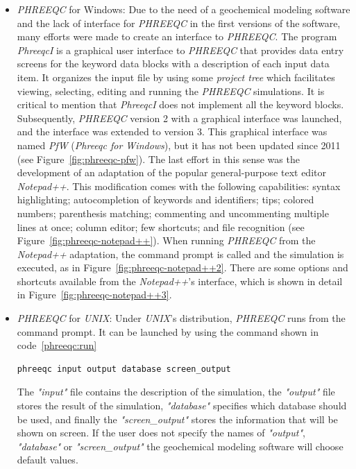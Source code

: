 \begin{itemize}
\item \emph{PHREEQC} for Windows: Due to the need of a geochemical modeling software and the lack of interface for \emph{PHREEQC} in the first versions of the software, many efforts were made to create an interface to \emph{PHREEQC}. The program \emph{PhreeqcI} is a graphical user interface to \emph{PHREEQC} that provides data entry screens for the keyword data blocks with a description of each input data item. It organizes the input file by using some \emph{project tree} which facilitates viewing, selecting, editing and running the \emph{PHREEQC} simulations. It is critical to mention that \emph{PhreeqcI} does not implement all the keyword blocks. Subsequently, \emph{PHREEQC} version 2 with a graphical interface was launched, and the interface was extended to version 3. This graphical interface was named \emph{PfW} (\emph{Phreeqc for Windows}), but it has not been updated since 2011 (see Figure~\ref{fig:phreeqc-pfw}). The last effort in this sense was the development of an adaptation of the popular general-purpose text editor \emph{Notepad++}. This modification comes with the following capabilities: syntax highlighting; autocompletion of keywords and identifiers; tips; colored numbers; parenthesis matching; commenting and uncommenting multiple lines at once; column editor; few shortcuts; and file recognition (see Figure~\ref{fig:phreeqc-notepad++}). When running \emph{PHREEQC} from the \emph{Notepad++} adaptation, the command prompt is called and the simulation is executed, as in Figure~\ref{fig:phreeqc-notepad++2}. There are some options and shortcuts available from the \emph{Notepad++}'s interface, which is shown in detail in Figure~\ref{fig:phreeqc-notepad++3}.
\item \emph{PHREEQC} for \emph{UNIX}: Under \emph{UNIX}'s distribution, \emph{PHREEQC} runs from the command prompt. It can be launched by using the command shown in code~\ref{phreeqc:run}
\begin{lstlisting}[frame=single, caption=Command to run UNIX's \emph{PHREEQC}, label=phreeqc:run]
phreeqc input output database screen_output
\end{lstlisting}
The \emph{"input"} file contains the description of the simulation, the \emph{"output"} file stores the result of the simulation, \emph{"database"} specifies which database should be used, and finally the \emph{"screen\_output"} stores the information that will be shown on screen. If the user does not specify the names of \emph{"output"}, \emph{"database"} or \emph{"screen\_output"} the geochemical modeling software will choose default values.
\end{itemize}

